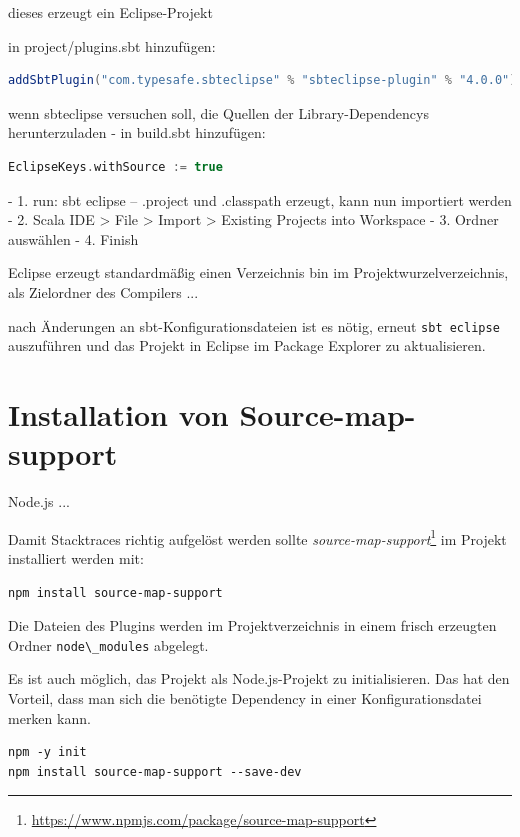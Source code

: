 \documentclass[a4paper, 12pt, hidelinks, listof=totoc, listoftables=totoc, bibliography=totoc]{scrreprt}
\newcommand{\code}[1]{\lstinline[language=Scala, style=inline]|#1|}
\begin{document}
dieses erzeugt ein Eclipse-Projekt

in project/plugins.sbt hinzufügen:
\begin{lstlisting}[language=Scala, style=snippet]
addSbtPlugin("com.typesafe.sbteclipse" % "sbteclipse-plugin" % "4.0.0")
\end{lstlisting}

wenn sbteclipse versuchen soll, die Quellen der Library-Dependencys herunterzuladen - in build.sbt hinzufügen:

\begin{lstlisting}[language=Scala, style=snippet]
EclipseKeys.withSource := true
\end{lstlisting}



- 1. run:
  sbt eclipse  --  .project und .classpath erzeugt, kann nun importiert werden
- 2. Scala IDE > File > Import > Existing Projects into Workspace
- 3. Ordner auswählen
- 4. Finish


Eclipse erzeugt standardmäßig einen Verzeichnis bin im Projektwurzelverzeichnis, als Zielordner des Compilers ...

nach Änderungen an sbt-Konfigurationsdateien ist es nötig, erneut \code{sbt eclipse} auszuführen und das Projekt in Eclipse im Package Explorer zu aktualisieren.






\section{Installation von Source-map-support}

Node.js ...

Damit Stacktraces richtig aufgelöst werden sollte \emph{source-map-support}\footnote{\url{https://www.npmjs.com/package/source-map-support}} im Projekt installiert werden mit:

\begin{lstlisting}[style=snippet]
npm install source-map-support
\end{lstlisting}

Die Dateien des Plugins werden im Projektverzeichnis in einem frisch erzeugten Ordner \code{node\_modules} abgelegt.

Es ist auch möglich, das Projekt als Node.js-Projekt zu initialisieren. Das hat den Vorteil, dass man sich die benötigte Dependency in einer Konfigurationsdatei merken kann.

\begin{lstlisting}[style=snippet]
npm -y init
npm install source-map-support --save-dev
\end{lstlisting}
\end{document}
